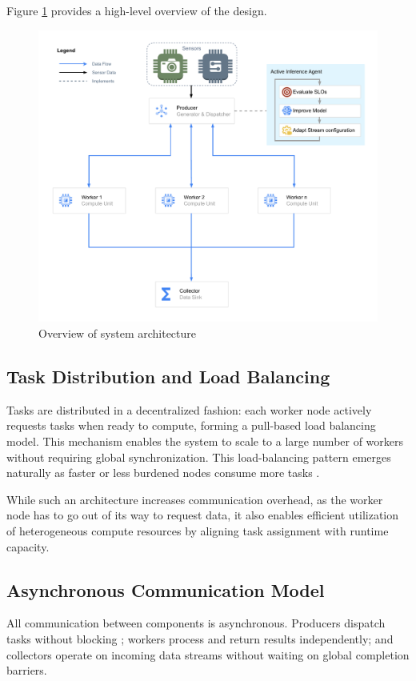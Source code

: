 Figure \ref{fig:parallel-distributed-pipeline} provides a high-level overview of the design.

\begin{figure}[htbp]
    \centering
    \includegraphics[width=\textwidth]{img/methodology/methodology_parallel_pipeline_overview.drawio.pdf}
    \caption{Overview of system architecture}
    \label{fig:parallel-distributed-pipeline}
\end{figure}


\subsection{Task Distribution and Load Balancing}
Tasks are distributed in a decentralized fashion: each worker node actively requests tasks when ready to compute, forming a pull-based load balancing model. This mechanism enables the system to scale to a large number of workers without requiring global synchronization. This load-balancing pattern emerges naturally as faster or less burdened nodes consume more tasks \cite{estrada_comparing_2015}.

While such an architecture increases communication overhead, as the worker node has to go out of its way to request data, it also enables efficient utilization of heterogeneous compute resources by aligning task assignment with runtime capacity.

\subsection{Asynchronous Communication Model}
All communication between components is asynchronous. Producers dispatch tasks without blocking \cite{lauener_how_2018}; workers process and return results independently; and collectors operate on incoming data streams without waiting on global completion barriers.

